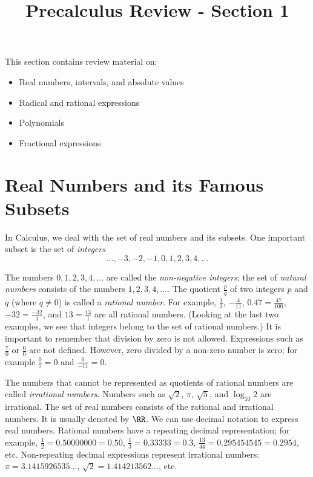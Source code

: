 \documentclass{ximera}
\title{Precalculus Review - Section 1}
\begin{document}
\begin{abstract}
%
\end{abstract}
\maketitle

This section contains review material on:
\begin{itemize}
	\item Real numbers, intervals, and absolute values
	\item Radical and rational expressions
	\item Polynomials
	\item Fractional expressions
\end{itemize}

\section{Real Numbers and its Famous Subsets}
In Calculus, we deal with the set of real numbers and its subsets.  One important subset is the set of \emph{integers}
\[ \ldots, -3, -2, -1, 0, 1, 2, 3, 4, \ldots \]

The numbers $0, 1, 2, 3, 4, \ldots$ are called the \emph{non-negative integers}; the set of \emph{natural numbers} consists of
the numbers $1, 2, 3, 4, \ldots$.  The quotient $\displaystyle \frac{p}{q}$ of two integers $p$ and $q$ (where $q \neq 0$) is called
a \emph{rational number}.  For example, $\frac{1}{3}$, $-\frac{4}{11}$, $0.47=\frac{47}{100}$,
$-32 = \frac{-32}{1}$, and $13 = \frac{13}{1}$ are all rational numbers.  (Looking at the last two examples,
we see that integers belong to the set of rational numbers.)  It is important to remember that division by zero is not allowed.  Expressions such as $\frac{7}{0}$ or $\displaystyle \frac{0}{0}$ are not defined.  However, zero divided by a non-zero number is zero; for example $\frac{0}{7} = 0$ and $\displaystyle \frac{0}{-11}=0$.

The numbers that cannot be represented as quotients of rational numbers are called \emph{irrational numbers}.  Numbers such as $\sqrt{2}$, $\pi$, $\sqrt{5}$, and $\log_{10} 2$ are irrational.  The set of real numbers consists of the rational and irrational numbers.  It is usually denoted by $\RR$. We can use decimal notation to express real numbers.  Rational numbers have a repeating decimal representation; for example, $\frac{1}{2}=0.50000000=0.5\bar{0}$, $\frac{1}{3}=0.33333=0.\bar{3}$, $\frac{13}{44}=0.295454545 = 0.29\bar{54}$, etc. Non-repeating decimal expressions represent irrational numbers: $\pi = 3.1415926535\ldots$, $\sqrt{2}=1.414213562\ldots$, etc.
\end{document}
